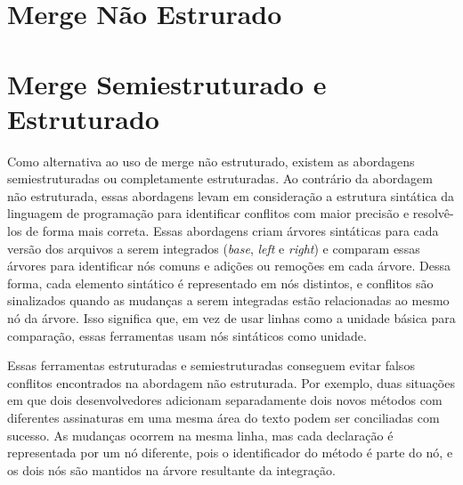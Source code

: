 \section{Merge Não Estrurado}
\section{Merge Semiestruturado e Estruturado}
Como alternativa ao uso de merge não estruturado, existem as abordagens
semiestruturadas ou completamente estruturadas. Ao contrário da abordagem não
estruturada, essas abordagens levam em consideração a estrutura sintática da
linguagem de programação para identificar conflitos com maior precisão e resolvê-los de
forma mais correta. Essas abordagens criam árvores sintáticas para
cada versão dos arquivos a serem integrados (\emph{base}, \emph{left} e \emph{right})
e comparam essas árvores para identificar nós comuns
e adições ou remoções em cada árvore. Dessa forma, cada elemento sintático
é representado em nós distintos, e conflitos são sinalizados quando as mudanças
a serem integradas estão relacionadas ao mesmo nó da árvore. Isso significa
que, em vez de usar linhas como a unidade básica para comparação, essas ferramentas usam
nós sintáticos como unidade.

Essas ferramentas estruturadas e semiestruturadas conseguem evitar falsos conflitos
encontrados na abordagem não estruturada. Por exemplo, duas situações em
que dois desenvolvedores adicionam separadamente dois novos métodos com diferentes
assinaturas em uma mesma área do texto podem ser conciliadas com sucesso.
As mudanças ocorrem na mesma linha, mas cada declaração é representada por
um nó diferente, pois o identificador do método é parte do nó,
e os dois nós são mantidos na árvore resultante da integração.

